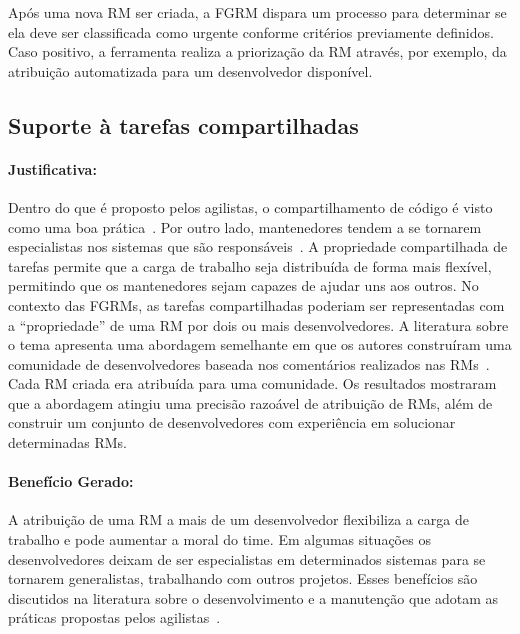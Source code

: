 Após uma nova RM ser criada, a FGRM dispara um processo para determinar se ela
deve ser classificada como urgente conforme critérios previamente definidos.
Caso positivo, a ferramenta realiza a priorização da RM através, por exemplo, da
atribuição automatizada para um desenvolvedor disponível.

\subsection{Suporte à tarefas compartilhadas}
\label{sub:suporte_tarefas_compartilhadas}


\paragraph{Justificativa:}
\label{par:justificativa_s08}

Dentro do que é proposto pelos agilistas, o compartilhamento de código é visto
como uma boa prática~\cite{meyer2014agile}. Por outro lado, mantenedores tendem
a se tornarem especialistas nos sistemas que são
responsáveis~\cite{singer1998practices}. A propriedade compartilhada de tarefas
permite que a carga de trabalho seja distribuída de forma mais flexível,
permitindo que os mantenedores sejam capazes de ajudar uns aos outros. No
contexto das FGRMs, as tarefas compartilhadas poderiam ser representadas com a
``propriedade'' de uma RM por dois ou mais desenvolvedores. A literatura sobre
o tema apresenta uma abordagem semelhante em que os autores construíram uma
comunidade de desenvolvedores baseada nos comentários realizados nas
RMs~\cite{banitaan2013decoba}. Cada RM criada era atribuída para uma
comunidade. Os resultados mostraram que a abordagem atingiu uma precisão
razoável de atribuição de RMs, além de construir um conjunto de desenvolvedores
com experiência em solucionar determinadas RMs.

\paragraph{Benefício Gerado:}
\label{par:papéis_afetados_s08}

A atribuição de uma RM a mais de um desenvolvedor flexibiliza a carga de
trabalho e pode aumentar a moral do time. Em algumas situações os
desenvolvedores deixam de ser especialistas em determinados sistemas para se
tornarem generalistas, trabalhando com outros projetos. Esses benefícios são
discutidos na literatura sobre o desenvolvimento e a manutenção que adotam as
práticas propostas pelos agilistas~\cite{dybaa2008empirical,rudzki2009agile}.

